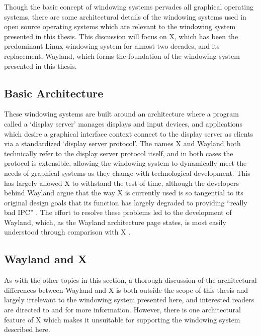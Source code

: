 Though the basic concept of windowing systems pervades all graphical operating systems, there are some architectural details of the windowing systems used in open source operating systems which are relevant to the windowing system presented in this thesis. This discussion will focus on X, which has been the predominant Linux windowing system for almost two decades, and its replacement, Wayland, which forms the foundation of the windowing system presented in this thesis.

\subsection{Basic Architecture}

These windowing systems are built around an architecture where a program called a ‘display server’ manages displays and input devices, and applications which desire a graphical interface context connect to the display server as clients via a standardized ‘display server protocol’. The names X and Wayland both technically refer to the display server protocol itself, and in both cases the protocol is extensible, allowing the windowing system to dynamically meet the needs of graphical systems as they change with technological development. This has largely allowed X to withstand the test of time, although the developers behind Wayland argue that the way X is currently used is so tangential to its original design goals that its function has largely degraded to providing “really bad IPC” \cite{real-story-wayland}. The effort to resolve these problems led to the development of Wayland, which, as the Wayland architecture page states, is most easily understood through comparison with X \cite{wayland}.

\subsection{Wayland and X}

As with the other topics in this section, a thorough discussion of the architectural differences between Wayland and X is both outside the scope of this thesis and largely irrelevant to the windowing system presented here, and interested readers are directed to \cite{wayland} and \cite{real-story-wayland} for more information. However, there is one architectural feature of X which makes it unsuitable for supporting the windowing system described here.

